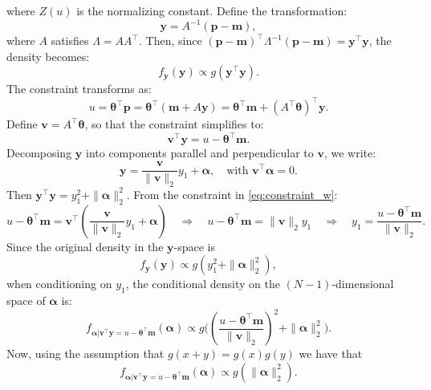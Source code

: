 \documentclass{article} %
\begin{document}
where $Z(u)$ is the normalizing constant. Define the transformation:
$$
\mathbf{y} = A^{-1}(\mathbf{p}-\mathbf{m}),
$$
where $A$ satisfies $\Lambda = AA^{\top}$. Then, since
$(\mathbf{p}-\mathbf{m})^{\top}\Lambda^{-1}(\mathbf{p}-\mathbf{m}) = \mathbf{y}^{\top}\mathbf{y}$, the density becomes:
$$
f_\mathbf{y}(\mathbf{y}) \propto g(\mathbf{y}^{\top} \mathbf{y}).
$$
The constraint transforms as:
$$
u = \boldsymbol{\theta}^{\top} \mathbf{p} = \boldsymbol{\theta}^{\top}(\mathbf{m} + A \mathbf{y}) = \boldsymbol{\theta}^{\top}\mathbf{m} + (A^{\top} \boldsymbol{\theta})^{\top} \mathbf{y}.
$$
Define $\boldsymbol{v} = A^{\top} \boldsymbol{\theta}$, so that the constraint simplifies to:
\begin{equation}\label{eq:constraint_w}
\boldsymbol{v}^{\top} \mathbf{y} = u - \boldsymbol{\theta}^{\top}\mathbf{m}. 
\end{equation}
Decomposing $\mathbf{y}$ into components parallel and perpendicular to $\boldsymbol{v}$, we write:
\begin{equation}\label{eq:v_transp_alpha}
\mathbf{y} = \frac{\boldsymbol{v}}{\|\boldsymbol{v}\|_2} y_1 + \boldsymbol{\alpha}, \quad \text{with } \boldsymbol{v}^{\top} \boldsymbol{\alpha} = 0.
\end{equation}
Then $\mathbf{y}^{\top}\mathbf{y}= y_1^2 + \|\boldsymbol{\alpha}\|_2^2$.
From the constraint in \cref{eq:constraint_w}:
\[
u - \boldsymbol{\theta}^{\top}\mathbf{m}=\boldsymbol{v}^{\top} \left( \frac{\boldsymbol{v}}{\|\boldsymbol{v}\|_2} y_1 + \boldsymbol{\alpha}\right) \quad 
 \Rightarrow \quad u - \boldsymbol{\theta}^{\top}\mathbf{m} =  \|\boldsymbol{v}\|_2 y_1 \quad \Rightarrow \quad y_1 = \frac{u - \boldsymbol{\theta}^{\top}\mathbf{m}}{\|\boldsymbol{v}\|_2}.
\]
Since the original density in the $\mathbf{y}$-space is 
$$
f_{\mathbf{y}}(\mathbf{y}) \propto g(y_1^2 + \|\boldsymbol{\alpha}\|^2_2),
$$
when conditioning on $y_1$, the conditional density on the $(N-1)$-dimensional space of $\boldsymbol{\alpha}$ is:
$$
f_{\boldsymbol{\alpha}|\boldsymbol{v}^{\top} \mathbf{y} = u-\boldsymbol{\theta}^{\top}\mathbf{m}}(\boldsymbol{\alpha}) \propto g\Biggl(\left(\frac{u-\boldsymbol{\theta}^{\top}\mathbf{m}}{\|\boldsymbol{v}\|_2}\right)^2 + \|\boldsymbol{\alpha}\|_2^2\Biggr).
$$
Now, using the assumption that $g(x+y)=g(x)g(y)$ we have that
\begin{equation}\label{eq:g_alpha}
f_{\boldsymbol{\alpha}|\boldsymbol{v}^{\top} \mathbf{y} = u-\boldsymbol{\theta}^{\top}\mathbf{m}}(\boldsymbol{\alpha}) \propto g(\|\boldsymbol{\alpha}\|_2^2).
\end{equation}
\end{document}
